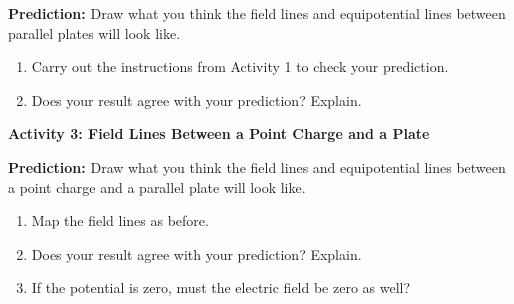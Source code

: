 \textbf{Prediction:} Draw what you think the field lines and equipotential
lines between parallel plates will look like.
\vspace{1in}

\begin{enumerate}
\item Carry out the instructions from Activity 1 to check your prediction.
\item Does your result agree with your prediction? Explain.\vspace{15mm}

\end{enumerate}
\textbf{Activity 3: Field Lines Between a Point Charge and a Plate}

\textbf{Prediction:} Draw what you think the field lines and equipotential
lines between a point charge and a parallel plate will look like.
\vspace{1in}

\begin{enumerate}
\item Map the field lines as before.
\item Does your result agree with your prediction? Explain.\vspace{15mm}

\item If the potential is zero, must the electric field be zero as well?\vspace{15mm}


\end{enumerate}



